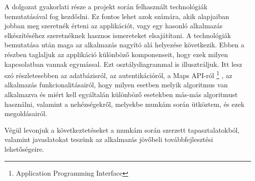 A dolgozat gyakorlati része a projekt során felhasznált technológiák bemutatásával fog kezdődni. Ez fontos lehet azok számára, akik alapjaiban jobban meg szeretnék érteni az applikációt, vagy egy hasonló alkalmazás elkészítéséhez szeretnéknek hasznos ismereteket elsajátítani. A technológiák bemutatása után maga az alkalmazás nagyító alá helyezése következik. Ebben a részben taglaljuk az applikáció különböző komponenseit, hogy ezek milyen kapcsolatban vannak egymással. Ezt osztálydiagrammal is illusztráljuk. Itt lesz szó részletesebben az adatbázisról, az autentikációról, a Maps API-ról%
\footnote{ %
	Application Programming Interface
}  %
, az alkalmazás funkcionalitásairól, hogy milyen esetben melyik algoritmus van alkalmazva és miért kell egyáltalán különböző esetekben más-más algoritmust használni, valamint a nehézségekről, melyekbe munkám során ütköztem, és ezek megoldásairól.

Végül levonjuk a következtetéseket a munkám során szerzett tapasztalatokból, valamint javaslatokat teszünk az alkalmazás jövőbeli továbbfejlesztési lehetőségeire.

